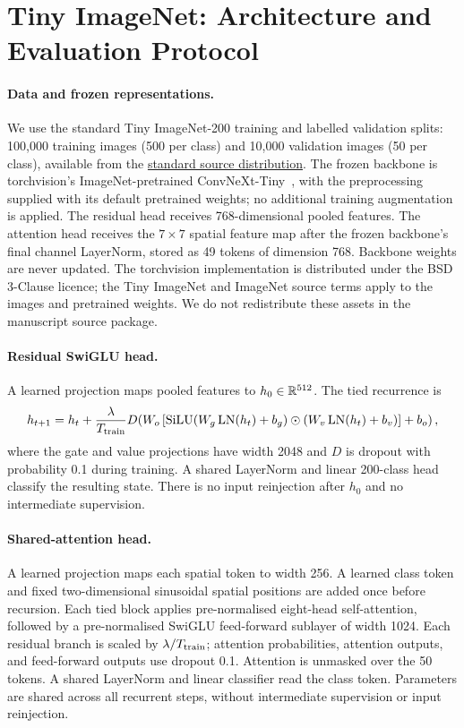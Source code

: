 \section{Tiny ImageNet: Architecture and Evaluation Protocol}
\label{app:modern_protocol}

\paragraph{Data and frozen representations.}
We use the standard Tiny ImageNet-200 training and labelled validation splits:
100,000 training images (500 per class) and 10,000 validation images (50 per
class), available from the
\href{http://cs231n.stanford.edu/tiny-imagenet-200.zip}{standard source distribution}.
The frozen backbone is
torchvision's ImageNet-pretrained ConvNeXt-Tiny~\citep{liu2022convnext}, with
the preprocessing supplied with its default pretrained weights; no
additional training augmentation is applied. The residual head receives
768-dimensional pooled features. The attention head receives the $7\times7$
spatial feature map after the frozen backbone's final channel LayerNorm,
stored as 49 tokens of dimension 768. Backbone weights are never updated.
The torchvision implementation is distributed under the BSD 3-Clause licence;
the Tiny ImageNet and ImageNet source terms apply to the images and pretrained
weights. We do not redistribute these assets in the manuscript source package.

\paragraph{Residual SwiGLU head.}
A learned projection maps pooled features to $h_0\in\mathbb{R}^{512}$. The tied
recurrence is
\[
 h_{t+1}=h_t+\frac{\lambda}{T_{\rm train}}
 D\!\left(W_o\left[\operatorname{SiLU}(W_g\operatorname{LN}(h_t)+b_g)
 \odot(W_v\operatorname{LN}(h_t)+b_v)\right]+b_o\right),
\]
where the gate and value projections have width 2048 and $D$ is dropout
with probability 0.1 during training. A shared LayerNorm and linear
200-class head classify the resulting state. There is no input reinjection
after $h_0$ and no intermediate supervision.

\paragraph{Shared-attention head.}
A learned projection maps each spatial token to width 256. A learned class
token and fixed two-dimensional sinusoidal spatial positions are added once
before recursion. Each tied block applies pre-normalised eight-head
self-attention, followed by a pre-normalised SwiGLU feed-forward sublayer
of width 1024. Each residual branch is scaled by $\lambda/T_{\rm train}$;
attention probabilities, attention outputs, and feed-forward outputs use
dropout 0.1. Attention is unmasked over the 50 tokens. A shared LayerNorm
and linear classifier read the class token. Parameters are shared across
all recurrent steps, without intermediate supervision or input reinjection.

